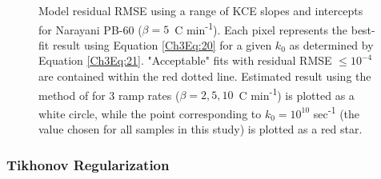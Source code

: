  \begin{figure}[t]
	\caption[Residual RMSE using a range of KCE slopes and intercepts for Narayani PB-60]{Model residual RMSE using a range of KCE slopes and intercepts for Narayani PB-60 ($\beta = 5$\textdegree\ C min\textsuperscript{-1}). Each pixel represents the best-fit result using Equation \ref{Ch3Eq:20} for a given $k_{0}$ as determined by Equation \ref{Ch3Eq:21}. "Acceptable" fits with residual RMSE $\leq 10^{-4}$ are contained within the red dotted line. Estimated result using the method of \citet{Miura:1998jf} for 3 ramp rates ($\beta = 2, 5, 10$\textdegree\ C min\textsuperscript{-1}) is plotted as a white circle, while the point corresponding to $k_{0} = 10^{10}$ sec\textsuperscript{-1} (the value chosen for all samples in this study) is plotted as a red star.}
	\label{Ch3Fig:5} 
\end{figure}

\subsubsection{Tikhonov Regularization}

